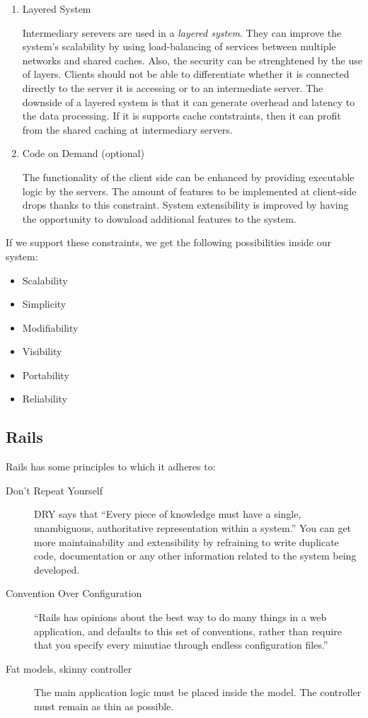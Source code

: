 \begin{enumerate}[label=\arabic*)]
  \item Layered System

    Intermediary serevers are used in a \textit{layered system}. They can improve the system's scalability by using load-balancing of services between multiple networks and shared caches. Also, the security can be strenghtened by the use of layers. Clients should not be able to differentiate whether it is connected directly to the server it is accessing or to an intermediate server.
    The downside of a layered system is that it can generate overhead and latency to the data processing. If it is supports cache contstraints, then it can profit from the shared caching at intermediary servers.

  \item Code on Demand (optional)

    The functionality of the client side can be enhanced by providing executable logic by the servers. The amount of features to be implemented at client-side drops thanks to this constraint. System extensibility is improved by having the opportunity to download additional features to the system.

\end{enumerate}

If we support these constraints, we get the following possibilities inside our system:
\begin{itemize} 
  \item Scalability
  \item Simplicity
  \item Modifiability
  \item Visibility
  \item Portability
  \item Reliability
\end{itemize}


\subsection{Rails}

Rails has some principles to which it adheres to:
\begin{description}

  \item[Don't Repeat Yourself] DRY says that ``Every piece of knowledge must have a single, unambiguous, authoritative representation within a system.'' \cite{dry_principle} You can get more maintainability and extensibility by refraining to write duplicate code, documentation or any other information related to the system being developed. 

  \item[Convention Over Configuration] ``Rails has opinions about the best way to do many things in a web application, and defaults to this set of conventions, rather than require that you specify every minutiae through endless configuration files.'' \cite{rails_principles}

  \item[Fat models, skinny controller] The main application logic must be placed inside the model. The controller must remain as thin as possible. 
\end{description}


